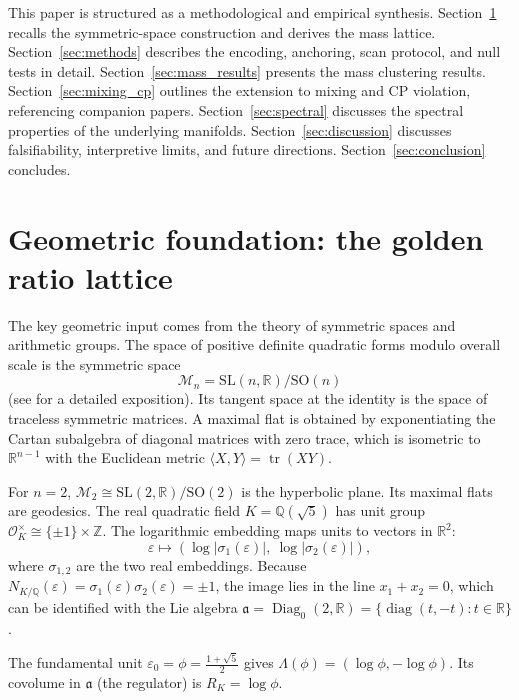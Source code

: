 \documentclass[12pt]{article}
\theoremstyle{definition}
\begin{document}
This paper is structured as a methodological and empirical synthesis. Section~\ref{sec:geom} recalls the symmetric-space construction and derives the mass lattice. Section~\ref{sec:methods} describes the encoding, anchoring, scan protocol, and null tests in detail. Section~\ref{sec:mass_results} presents the mass clustering results. Section~\ref{sec:mixing_cp} outlines the extension to mixing and CP violation, referencing companion papers. Section~\ref{sec:spectral} discusses the spectral properties of the underlying manifolds. Section~\ref{sec:discussion} discusses falsifiability, interpretive limits, and future directions. Section~\ref{sec:conclusion} concludes.

\section{Geometric foundation: the golden ratio lattice}
\label{sec:geom}

The key geometric input comes from the theory of symmetric spaces and arithmetic groups. The space of positive definite quadratic forms modulo overall scale is the symmetric space
\[
\mathcal{M}_n = \mathrm{SL}(n,\mathbb{R})/\mathrm{SO}(n)
\]
(see \cite{Gentry:ShapeSpace} for a detailed exposition). Its tangent space at the identity is the space of traceless symmetric matrices. A maximal flat is obtained by exponentiating the Cartan subalgebra of diagonal matrices with zero trace, which is isometric to $\mathbb{R}^{n-1}$ with the Euclidean metric $\langle X,Y\rangle = \operatorname{tr}(XY)$.

For $n=2$, $\mathcal{M}_2 \cong \mathrm{SL}(2,\mathbb{R})/\mathrm{SO}(2)$ is the hyperbolic plane. Its maximal flats are geodesics. The real quadratic field $K = \mathbb{Q}(\sqrt5)$ has unit group $\mathcal{O}_K^\times \cong \{\pm1\}\times\mathbb{Z}$. The logarithmic embedding maps units to vectors in $\mathbb{R}^2$:
\[
\varepsilon \longmapsto (\log|\sigma_1(\varepsilon)|,\ \log|\sigma_2(\varepsilon)|),
\]
where $\sigma_{1,2}$ are the two real embeddings. Because $N_{K/\mathbb{Q}}(\varepsilon)= \sigma_1(\varepsilon)\sigma_2(\varepsilon) = \pm1$, the image lies in the line $x_1+x_2=0$, which can be identified with the Lie algebra $\mathfrak{a} = \operatorname{Diag}_0(2,\mathbb{R}) = \{\operatorname{diag}(t,-t) : t\in\mathbb{R}\}$.

The fundamental unit $\varepsilon_0 = \phi = \frac{1+\sqrt5}{2}$ gives $\Lambda(\phi)= (\log\phi, -\log\phi)$. Its covolume in $\mathfrak{a}$ (the regulator) is $R_K = \log\phi$.
\end{document}
